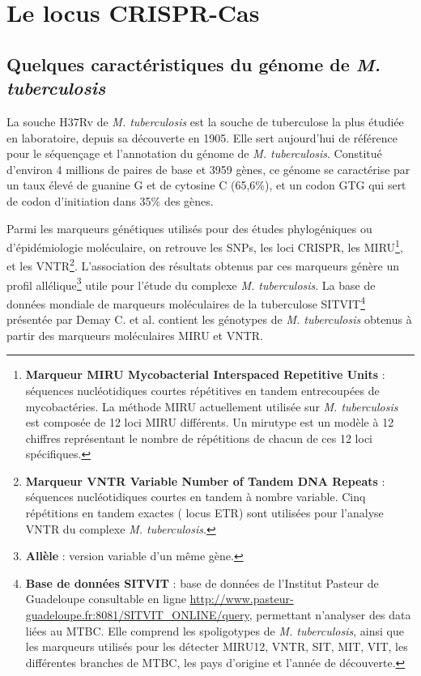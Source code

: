 \documentclass[twoside,a4paper,11pt,frenchb,openany]{report}
\begin{document}

\section{Le locus CRISPR-Cas}

\subsection{Quelques caractéristiques du génome de \textit{M. tuberculosis}}

La souche H37Rv de \textit{M. tuberculosis} est la souche de tuberculose la plus étudiée en laboratoire, depuis sa découverte en 1905. Elle sert aujourd'hui de référence pour le séquençage et l'annotation du génome de \textit{M. tuberculosis}. Constitué d'environ 4 millions de paires de base et 3959 gènes, ce génome se caractérise par un taux élevé de guanine G et de cytosine C (65,6\%), et un codon GTG qui sert de codon d'initiation dans 35\% des gènes. 

Parmi les marqueurs génétiques utilisés pour des études phylogéniques ou d'épidémiologie moléculaire, on retrouve les SNPs, les loci CRISPR, les MIRU\footnote{\textbf{Marqueur MIRU Mycobacterial Interspaced Repetitive Units} : séquences nucléotidiques courtes répétitives en tandem entrecoupées de mycobactéries. La méthode MIRU actuellement utilisée sur \textit{M. tuberculosis} est composée de 12 loci MIRU différents. Un mirutype est un modèle à 12 chiffres représentant le nombre de répétitions de chacun de ces 12 loci spécifiques.}, et les VNTR\footnote{\textbf{Marqueur VNTR Variable Number of Tandem DNA Repeats} : séquences nucléotidiques courtes en tandem à nombre variable. Cinq répétitions en tandem exactes ( locus ETR) sont utilisées pour l'analyse VNTR du complexe \textit{M. tuberculosis}.}. L'association des résultats obtenus par ces marqueurs génère un profil allélique\footnote{\textbf{Allèle} : version variable d'un même gène.} utile pour l'étude du complexe \textit{M. tuberculosis}. La base de données mondiale de marqueurs moléculaires de la tuberculose SITVIT\footnote{\textbf{Base de données SITVIT} : base de données de l'Institut Pasteur de Guadeloupe consultable en ligne \url{http://www.pasteur-guadeloupe.fr:8081/SITVIT_ONLINE/query}, permettant n'analyser des data liées au MTBC. Elle comprend les spoligotypes de \textit{M. tuberculosis}, ainsi que les marqueurs utilisés pour les détecter MIRU12, VNTR, SIT, MIT, VIT, les différentes branches de MTBC, les pays d'origine et l'année de découverte.} présentée par Demay C. et al.\cite{demay} contient les génotypes de \textit{M. tuberculosis} obtenus à partir des marqueurs moléculaires MIRU et VNTR.
\end{document}
